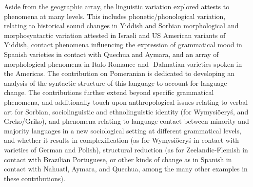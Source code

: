\documentclass[output=paper]{langscibook}
\begin{document}
Aside from the geographic array, the linguistic variation explored attests to phenomena at many levels. This includes phonetic/phonological variation, relating to historical sound changes in Yiddish and Sorbian morphological and morphosyntactic variation attested in Israeli and US American variants of Yiddish, contact phenomena influencing the expression of grammatical mood in Spanish varieties in contact with Quechua and Aymara, and an array of morphological phenomena in Italo-Romance and -Dalmatian varieties spoken in the Americas. The contribution on Pomeranian is dedicated to developing an analysis of the syntactic structure of this language to account for language change. The contributions further extend beyond specific grammatical phenomena, and additionally touch upon anthropological issues relating to verbal art for Sorbian, sociolinguistic and ethnolinguistic identity (for Wymysiöeryś, and Greko/Griko), and phenomena relating to language contact between minority and majority languages in a new sociological setting at different grammatical levels, and whether it results in complexification (as for Wymysiöeryś in contact with varieties of German and Polish), structural reduction (as for Zeelandic-Flemish in contact with Brazilian Portuguese, or other kinds of change as in Spanish in contact with Nahuatl, Aymara, and Quechua, among the many
other examples in these contributions).

\end{document}
